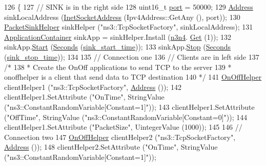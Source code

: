 \begin{DoxyCode}
126 \{
127   \textcolor{comment}{// SINK is in the right side}
128   uint16\_t \hyperlink{dsdv-manet_8cc_a8e0798404bf2cf5dabb84c5ba9a4f236}{port} = 50000;
129   \hyperlink{classns3_1_1Address}{Address} sinkLocalAddress (\hyperlink{classns3_1_1InetSocketAddress}{InetSocketAddress} (Ipv4Address::GetAny (), port));
130   \hyperlink{classns3_1_1PacketSinkHelper}{PacketSinkHelper} sinkHelper (\textcolor{stringliteral}{"ns3::TcpSocketFactory"}, sinkLocalAddress);
131   \hyperlink{classns3_1_1ApplicationContainer}{ApplicationContainer} sinkApp = sinkHelper.Install (\hyperlink{adaptive-red-tests_8cc_a71269c713841141f40860e991d435588}{n3n4}.
      \hyperlink{classns3_1_1NodeContainer_a9ed96e2ecc22e0f5a3d4842eb9bf90bf}{Get} (1));
132   sinkApp.\hyperlink{classns3_1_1ApplicationContainer_a8eff87926507020bbe3e1390358a54a7}{Start} (\hyperlink{group__timecivil_ga33c34b816f8ff6628e33d5c8e9713b9e}{Seconds} (\hyperlink{adaptive-red-tests_8cc_a2c56dc9b543a4442a7edd8d680c4a1bc}{sink\_start\_time}));
133   sinkApp.\hyperlink{classns3_1_1ApplicationContainer_adfc52f9aa4020c8714679b00bbb9ddb3}{Stop} (\hyperlink{group__timecivil_ga33c34b816f8ff6628e33d5c8e9713b9e}{Seconds} (\hyperlink{adaptive-red-tests_8cc_a2462eef540f5b896f14d4ea7b7bb6214}{sink\_stop\_time}));
134 
135   \textcolor{comment}{// Connection one}
136   \textcolor{comment}{// Clients are in left side}
137   \textcolor{comment}{/*}
138 \textcolor{comment}{   * Create the OnOff applications to send TCP to the server}
139 \textcolor{comment}{   * onoffhelper is a client that send data to TCP destination}
140 \textcolor{comment}{  */}
141   \hyperlink{classns3_1_1OnOffHelper}{OnOffHelper} clientHelper1 (\textcolor{stringliteral}{"ns3::TcpSocketFactory"}, \hyperlink{classns3_1_1Address}{Address} ());
142   clientHelper1.SetAttribute (\textcolor{stringliteral}{"OnTime"}, StringValue (\textcolor{stringliteral}{"ns3::ConstantRandomVariable[Constant=1]"}));
143   clientHelper1.SetAttribute (\textcolor{stringliteral}{"OffTime"}, StringValue (\textcolor{stringliteral}{"ns3::ConstantRandomVariable[Constant=0]"}));
144   clientHelper1.SetAttribute (\textcolor{stringliteral}{"PacketSize"}, UintegerValue (1000));
145 
146   \textcolor{comment}{// Connection two}
147   \hyperlink{classns3_1_1OnOffHelper}{OnOffHelper} clientHelper2 (\textcolor{stringliteral}{"ns3::TcpSocketFactory"}, \hyperlink{classns3_1_1Address}{Address} ());
148   clientHelper2.SetAttribute (\textcolor{stringliteral}{"OnTime"}, StringValue (\textcolor{stringliteral}{"ns3::ConstantRandomVariable[Constant=1]"}));

\end{DoxyCode}
